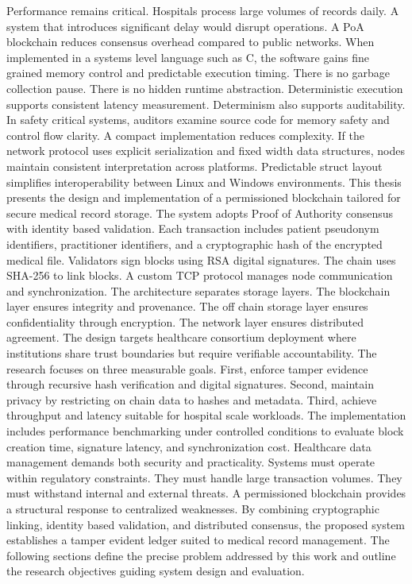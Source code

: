 Performance remains critical. Hospitals process large volumes of records daily. A system that introduces significant delay would disrupt operations. A PoA blockchain reduces consensus overhead compared to public networks. When implemented in a systems level language such as C, the software gains fine grained memory control and predictable execution timing. There is no garbage collection pause. There is no hidden runtime abstraction. Deterministic execution supports consistent latency measurement.
Determinism also supports auditability. In safety critical systems, auditors examine source code for memory safety and control flow clarity. A compact implementation reduces complexity. If the network protocol uses explicit serialization and fixed width data structures, nodes maintain consistent interpretation across platforms. Predictable struct layout simplifies interoperability between Linux and Windows environments.
This thesis presents the design and implementation of a permissioned blockchain tailored for secure medical record storage. The system adopts Proof of Authority consensus with identity based validation. Each transaction includes patient pseudonym identifiers, practitioner identifiers, and a cryptographic hash of the encrypted medical file. Validators sign blocks using RSA digital signatures. The chain uses SHA-256 to link blocks. A custom TCP protocol manages node communication and synchronization.
The architecture separates storage layers. The blockchain layer ensures integrity and provenance. The off chain storage layer ensures confidentiality through encryption. The network layer ensures distributed agreement. The design targets healthcare consortium deployment where institutions share trust boundaries but require verifiable accountability.
The research focuses on three measurable goals. First, enforce tamper evidence through recursive hash verification and digital signatures. Second, maintain privacy by restricting on chain data to hashes and metadata. Third, achieve throughput and latency suitable for hospital scale workloads. The implementation includes performance benchmarking under controlled conditions to evaluate block creation time, signature latency, and synchronization cost.
Healthcare data management demands both security and practicality. Systems must operate within regulatory constraints. They must handle large transaction volumes. They must withstand internal and external threats. A permissioned blockchain provides a structural response to centralized weaknesses. By combining cryptographic linking, identity based validation, and distributed consensus, the proposed system establishes a tamper evident ledger suited to medical record management.
The following sections define the precise problem addressed by this work and outline the research objectives guiding system design and evaluation.

